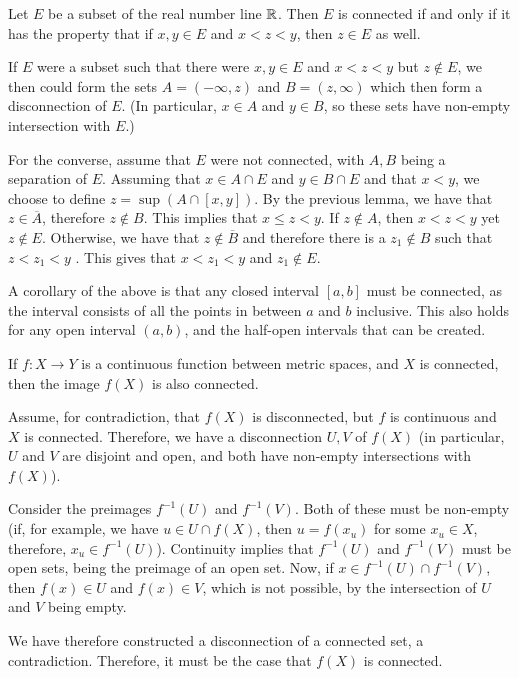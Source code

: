 \begin{blemma}{}{}
Let $E$ be a subset of the real number line $\mathbb{R}$. Then $E$ is connected if and only if it has the property that if $x,y\in E$ and $x< z < y$, then $z\in E$ as well.
\end{blemma}
\begin{bproof}{}{}
If $E$ were a subset such that there were $x,y\in E$ and $x < z < y$ but $z\not\in E$, we then could form the sets $A = (-\infty, z)$ and $B = (z, \infty)$ which then form a disconnection of $E$. (In particular, $x\in A$ and $y\in B$, so these sets have non-empty intersection with $E$.)

For the converse, assume that $E$ were not connected, with $A,B$ being a separation of $E$. Assuming that $x\in A\cap E$ and $y\in B\cap E$ and that $x<y$, we choose to define $z = \sup(A \cap [x,y])$. By the previous lemma, we have that $z\in \overline{A}$, therefore $z\not\in B$. This implies that $x\leq z < y$.
If $z\not\in A$, then $x < z < y$ yet $z\not\in E$. Otherwise, we have that $z\not\in \overline{B}$ and therefore there is a $z_{1}\not\in B$ such that $z < z_{1} < y$ . This gives that $x < z_{1} < y$ and $z_{1} \not\in E$.
\eop
\end{bproof}
A corollary of the above is that any closed interval $[a,b]$ must be connected, as the interval consists of all the points in between $a$ and $b$ inclusive. This also holds for any open interval $(a,b)$, and the half-open intervals that can be created.

\begin{btheorem}{}{}
If $f : X \to Y$ is a continuous function between metric spaces, and $X$ is connected, then the image $f(X)$ is also connected.
\end{btheorem}
\begin{bproof}{}{}
Assume, for contradiction, that $f(X)$ is disconnected, but $f$ is continuous and $X$ is connected. Therefore, we have a disconnection $U,V$ of $f(X)$ (in particular, $U$ and $V$ are disjoint and open, and both have non-empty intersections with $f(X)$).

Consider the preimages $f^{-1}(U)$ and $f^{-1}(V)$. Both of these must be non-empty (if, for example, we have \mbox{$u\in U\cap f(X)$}, then $u = f(x_{u})$ for some $x_{u}\in X$, therefore, $x_{u}\in f^{-1}(U)$). Continuity implies that $f^{-1}(U)$ and $f^{-1}(V)$ must be open sets, being the preimage of an open set. Now, if $x\in f^{-1}(U) \cap f^{-1}(V)$, then $f(x)\in U$ and $f(x)\in V$, which is not possible, by the intersection of $U$ and $V$ being empty.

We have therefore constructed a disconnection of a connected set, a contradiction. Therefore, it must be the case that $f(X)$ is connected.
\eop
\end{bproof}

